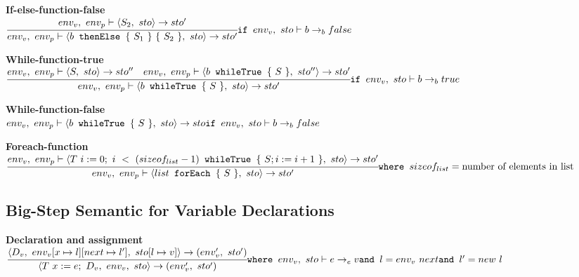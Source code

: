 \textbf{If-else-function-false}\\
\begin{math}
	\cfrac
		{env_v,\ env_p \vdash \langle S_2,\ sto \rangle \rightarrow sto'}
		{env_v,\ env_p \vdash \langle b \texttt{ thenElse } \{\ S_1\ \}\ \{\ S_2\ \},\ sto \rangle \rightarrow sto'}\\
	\texttt{if } env_v,\ sto \vdash b \rightarrow_b false
\end{math}

\textbf{While-function-true}\\
\begin{math}
	\cfrac
		{env_v,\ env_p \vdash \langle S,\ sto \rangle \rightarrow sto'' \quad env_v,\ env_p \vdash \langle  b \texttt{ whileTrue } \{\ S\ \} ,\ sto'' \rangle \rightarrow sto'}
		{env_v,\ env_p \vdash \langle b \texttt{ whileTrue } \{\ S\ \} ,\ sto \rangle \rightarrow sto'}\\
	\texttt{if } env_v,\ sto \vdash b \rightarrow_b true
\end{math}

\textbf{While-function-false}\\
\begin{math}
	env_v,\ env_p \vdash \langle b \texttt{ whileTrue } \{\ S\ \},\ sto \rangle \rightarrow sto\\
	\texttt{if } env_v,\ sto \vdash b \rightarrow_b false
\end{math}

\textbf{Foreach-function}\\
\begin{math}
	\cfrac
		{env_v,\ env_p \vdash \langle T\ i := 0;\ i\ <\ (sizeof_{list} - 1) \texttt{ whileTrue } \{\ S;i := i + 1\ \},\ sto \rangle \rightarrow sto'}
		{env_v,\ env_p \vdash \langle list \texttt{ forEach } \{\ S\ \},\ sto \rangle \rightarrow sto'}\\
		\texttt{where } sizeof_{list} = \text{number of elements in list}
\end{math}







\subsection{Big-Step Semantic for Variable Declarations}
\textbf{Declaration and assignment}\\
\begin{math}
	\cfrac
		{\langle D_v,\ env_v[x \mapsto l][next \mapsto l'],\ sto[l \mapsto v] \rangle \rightarrow (env_v',\ sto')}
		{\langle T\ x := e;\ D_v,\ env_v,\ sto \rangle \rightarrow (env_v',\ sto')}\\
	\texttt{where } env_v,\ sto \vdash e \rightarrow_e v\\
	\texttt{and } l = env_v\ next\\
	\texttt{and } l' = new\ l
\end{math}

